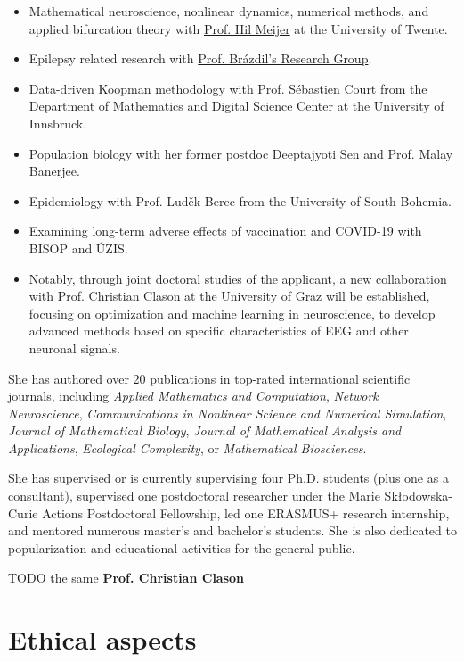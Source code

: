 \documentclass[a4paper,11pt]{scrartcl}
\begin{document}
\begin{itemize}
    \item Mathematical neuroscience, nonlinear dynamics, numerical methods, and applied bifurcation theory with \href{https://people.utwente.nl/h.g.e.meijer}{Prof. Hil Meijer} at the University of Twente.
    \item Epilepsy related research with \href{https://www.muni.cz/en/about-us/organizational-structure/ceitec/714004-milan-brazdil-rg}{Prof. Brázdil's Research Group}.
    \item Data-driven Koopman methodology with Prof. Sébastien Court from the Department of Mathematics and Digital Science Center at the University of Innsbruck.
    \item Population biology with her former postdoc Deeptajyoti Sen and Prof. Malay Banerjee.
    \item Epidemiology with Prof. Luděk Berec from the University of South Bohemia.
    \item Examining long-term adverse effects of vaccination and COVID-19 with BISOP and ÚZIS.
    \item Notably, through joint doctoral studies of the applicant, a new collaboration with Prof. Christian Clason at the University of Graz will be established, focusing on optimization and machine learning in neuroscience, to develop advanced methods based on specific  characteristics of EEG and other neuronal signals. 
\end{itemize}

She has authored over 20 publications in top-rated international scientific journals, including \textit{Applied Mathematics and Computation}, \textit{Network Neuroscience}, \textit{Communications in Nonlinear Science and Numerical Simulation}, \textit{Journal of Mathematical Biology}, \textit{Journal of Mathematical Analysis and Applications}, \textit{Ecological Complexity}, or \textit{Mathematical Biosciences}.

She has supervised or is currently supervising four Ph.D. students (plus one as a consultant), supervised one postdoctoral researcher under the Marie Skłodowska-Curie Actions Postdoctoral Fellowship, led one ERASMUS+ research internship, and mentored numerous master's and bachelor's students. She is also dedicated to popularization and educational activities for the general public.


TODO the same \textbf{Prof. Christian Clason}


\section{Ethical aspects}\label{sec:ethics}
\end{document}
